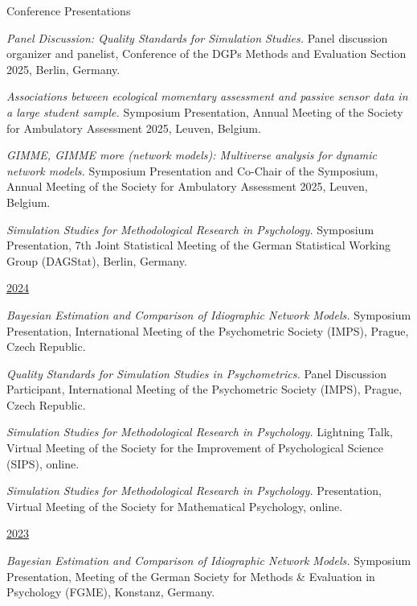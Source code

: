 \documentclass{resume} %
\begin{document}
\begin{rSection}{Conference Presentations}
\begin{etaremune}
\item \textit{Panel Discussion: Quality Standards for Simulation Studies.} Panel discussion organizer and panelist, Conference of the DGPs Methods and Evaluation Section 2025, Berlin, Germany.

\item \textit{Associations between ecological momentary assessment and passive sensor data in a large student sample.} Symposium Presentation, Annual Meeting of the Society for Ambulatory Assessment 2025, Leuven, Belgium. 

\item \textit{GIMME, GIMME more (network models): Multiverse analysis for dynamic network models.} Symposium Presentation and Co-Chair of the Symposium, Annual Meeting of the Society for Ambulatory Assessment 2025, Leuven, Belgium. 

\item \textit{Simulation Studies for Methodological Research in Psychology.} Symposium Presentation, 7th Joint Statistical Meeting of the German Statistical Working Group (DAGStat), Berlin, Germany.

\hspace{-0.75cm}\underline{2024}
\item \textit{Bayesian Estimation and Comparison of Idiographic Network Models.} Symposium Presentation, International Meeting of the Psychometric Society (IMPS), Prague, Czech Republic.

\item \textit{Quality Standards for Simulation Studies in Psychometrics.} Panel Discussion Participant, International Meeting of the Psychometric Society (IMPS), Prague, Czech Republic. 

\item \textit{Simulation Studies for Methodological Research in Psychology.} Lightning Talk, Virtual Meeting of the Society for the Improvement of Psychological Science (SIPS), online. 

\item \textit{Simulation Studies for Methodological Research in Psychology.} Presentation, Virtual Meeting of the Society for Mathematical Psychology, online. 

\hspace{-0.75cm}\underline{2023}

\item \textit{Bayesian Estimation and Comparison of Idiographic Network Models.} Symposium Presentation, Meeting of the German Society for Methods \& Evaluation in Psychology (FGME), Konstanz, Germany. 


\end{etaremune}
\end{rSection}
\end{document}
